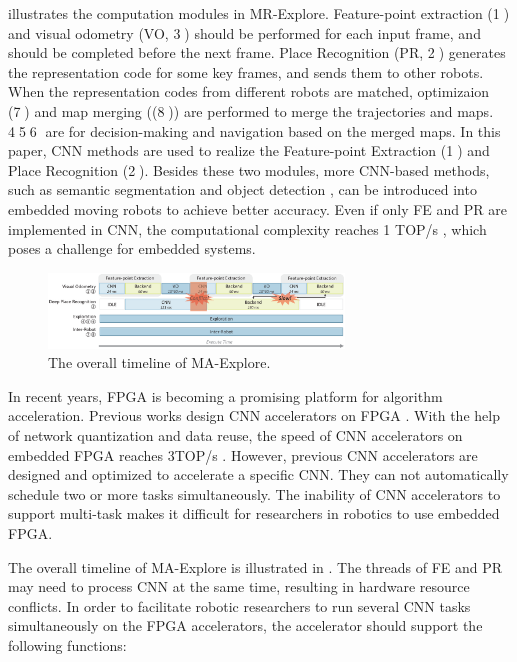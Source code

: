  illustrates the computation modules in MR-Explore.
Feature-point extraction (\textcircled{1}) and visual odometry (VO, \textcircled{3}) should be performed for each input frame, and should be completed before the next frame. 
Place Recognition (PR, \textcircled{2}) generates the representation code for some key frames, and sends them to other robots. 
When the  representation codes from different robots are matched, optimizaion (\textcircled{7}) and map merging ((\textcircled{8})) are performed to merge the trajectories and maps. \textcircled{4}\textcircled{5}\textcircled{6} are for decision-making and navigation based on the merged maps. 
In this paper, CNN methods are used to realize the Feature-point Extraction (\textcircled{1}) and  Place Recognition (\textcircled{2}).
Besides these two modules, more CNN-based methods, such as semantic segmentation \cite{long2015fully} and object detection \cite{ren2015faster}, can be introduced into embedded moving robots to achieve better accuracy.
Even if only FE and PR are implemented in CNN, the computational complexity reaches 1 TOP/s , which poses a challenge for embedded systems.


\begin{figure}[t]
    \centering
	\includegraphics[width=0.7\textwidth]{fig/overalltime.eps} 	
    \caption{
    The overall timeline of MA-Explore.
    }
	\label{fig:overalltime}
\end{figure}


In recent years, FPGA is becoming a promising platform for algorithm acceleration. Previous works design CNN accelerators on FPGA \cite{yu2018instruction,li_high_2016,qiu2016going,lu_evaluating_2017}. With the help of network quantization and data reuse, the speed of CNN accelerators on embedded FPGA reaches 3TOP/s \cite{lu_evaluating_2017}.
However, previous CNN accelerators are designed and optimized to accelerate a specific CNN. They can not automatically schedule two or more tasks simultaneously. 
The inability of CNN accelerators to support multi-task makes it difficult for researchers in robotics to use embedded FPGA.



The overall timeline of MA-Explore is illustrated in . 
The threads of FE and PR may need to process CNN at the same time, resulting in hardware resource conflicts. 
In order to facilitate robotic researchers to run several CNN tasks simultaneously on the FPGA accelerators, the accelerator should support the following functions:

